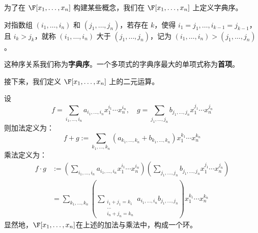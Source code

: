 为了在 \( \F[x_1,\dots,x_n] \) 构建某些概念，我们在 \( \F[x_1,\dots,x_n] \) 上定义字典序。
\begin{definition}\label{p1:concept:c1-l1324}
	对指数组 \( (i_1,\dots,i_n) \) 和 \( (j_1,\dots,j_n) \)，若存在 \( k \)，使得 \( i_1=j_1,\dots,i_{k-1}=j_{k-1} \)，且 \( i_k>j_k \)，就称 \( (i_1,\dots,i_n) \) 大于 \( (j_1,\dots,j_n) \)，记为 \( (i_1,\dots,i_n) > (j_1,\dots,j_n) \)。
	
	这种序关系我们称为\textbf{字典序}。一个多项式的字典序最大的单项式称为\textbf{首项}。
	
\end{definition}


接下来，我们定义 \( \F[x_1,\dots,x_n] \) 上的二元运算。

\begin{definition}\label{p1:concept:c1-l1334}
	设
	\[
	f = \sum_{i_1,\dots,i_n} a_{i_1,\dots,i_n} x_1^{i_1} \cdots x_n^{i_n}, \quad g = \sum_{j_1,\dots,j_n} b_{j_1,\dots,j_n} x_1^{j_1} \cdots x_n^{j_n}
	\]
	则加法定义为：
	\[
	f+g := \sum_{k_1,\dots,k_n} (a_{k_1,\dots,k_n} + b_{k_1,\dots,k_n}) x_1^{k_1} \cdots x_n^{k_n}
	\]
	乘法定义为：
	\[
	\begin{aligned}
		f \cdot g &:= \left( \sum_{i_1,\dots,i_n} a_{i_1,\dots,i_n} x_1^{i_1} \cdots x_n^{i_n} \right) \left( \sum_{j_1,\dots,j_n} b_{j_1,\dots,j_n} x_1^{j_1} \cdots x_n^{j_n} \right) \\
		&= \sum_{k_1,\dots,k_n} \left( \sum_{\substack{i_1+j_1=k_1 \\ \dots \\ i_n+j_n=k_n}} a_{i_1,\dots,i_n} b_{j_1,\dots,j_n} \right) x_1^{k_1} \cdots x_n^{k_n}
	\end{aligned}
	\]
	显然地，\( \F[x_1,\dots,x_n] \)在上述的加法与乘法中，构成一个环。
\end{definition}

